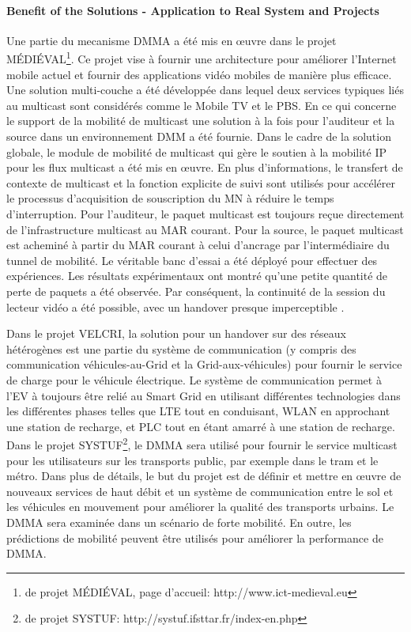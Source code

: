 \paragraph{Benefit of the Solutions - Application to Real System and Projects}
Une partie du mecanisme DMMA a été mis en œuvre dans le projet MÉDIÉVAL\footnote{de projet MÉDIÉVAL, page d'accueil: http://www.ict-medieval.eu}. Ce projet vise à fournir une architecture pour améliorer l'Internet mobile actuel et fournir des applications vidéo mobiles de manière plus efficace. Une solution multi-couche a été développée dans lequel deux services typiques liés au multicast sont considérés comme le Mobile TV et le PBS. En ce qui concerne le support de la mobilité de multicast une solution à la fois pour l'auditeur et la source dans un environnement DMM a été fournie. Dans le cadre de la solution globale, le module de mobilité de multicast qui gère le soutien à la mobilité IP pour les flux multicast a été mis en œuvre. En plus d'informations, le transfert de contexte de multicast et la fonction explicite de suivi sont utilisés pour accélérer le processus d'acquisition de souscription du MN à réduire le temps d'interruption. Pour l'auditeur, le paquet multicast est toujours reçue directement de l'infrastructure multicast au MAR courant. Pour la source, le paquet multicast est acheminé à partir du MAR courant à celui d'ancrage par l'intermédiaire du tunnel de mobilité. Le véritable banc d'essai a été déployé pour effectuer des expériences. Les résultats expérimentaux ont montré qu'une petite quantité de perte de paquets a été observée. Par conséquent, la continuité de la session du lecteur vidéo a été possible, avec un handover presque imperceptible \cite{ICC_Sergio}.

Dans le projet VELCRI, la solution pour un handover  sur ​​des réseaux hétérogènes est une partie du système de communication (y compris des communication véhicules-au-Grid et la Grid-aux-véhicules) pour fournir le service de charge pour le véhicule électrique. Le système de communication permet à l'EV à toujours être relié au Smart Grid en utilisant différentes technologies dans les différentes phases telles que LTE tout en conduisant, WLAN en approchant une station de recharge, et PLC tout en étant amarré à une station de recharge.\\ 

Dans le projet SYSTUF\footnote{de projet SYSTUF: http://systuf.ifsttar.fr/index-en.php}, le DMMA sera utilisé pour fournir le service multicast pour les utilisateurs sur les transports public, par exemple dans le tram et le métro. Dans plus de détails, le but du projet est de définir et mettre en œuvre de nouveaux services de haut débit et un système de communication entre le sol et les véhicules en mouvement pour améliorer la qualité des transports urbains. Le DMMA sera examinée dans un scénario de forte mobilité. En outre, les prédictions de mobilité peuvent être utilisés pour améliorer la performance de DMMA.

